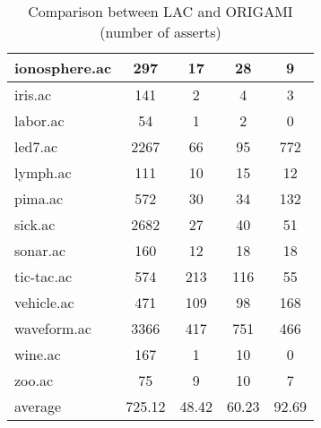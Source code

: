 \begin{table}[htbp]
\begin{tabular}{|l|c|c|c|c|}
		\hline
		ionosphere.ac   & 297           & 17                 & 28                       & 9                             \\
		\hline
		iris.ac         & 141           & 2                  & 4                        & 3                             \\
		\hline
		labor.ac        & 54            & 1                  & 2                        & 0                             \\
		\hline
		led7.ac         & 2267          & 66                 & 95                       & 772                           \\
		\hline
		lymph.ac        & 111           & 10                 & 15                       & 12                            \\
		\hline
		pima.ac         & 572           & 30                 & 34                       & 132                           \\
		\hline
		sick.ac         & 2682          & 27                 & 40                       & 51                            \\
		\hline
		sonar.ac        & 160           & 12                 & 18                       & 18                            \\
		\hline
		tic-tac.ac      & 574           & 213                & 116                      & 55                            \\
		\hline
		vehicle.ac      & 471           & 109                & 98                       & 168                           \\
		\hline
		waveform.ac     & 3366          & 417                & 751                      & 466                           \\
		\hline
		wine.ac         & 167           & 1                  & 10                       & 0                             \\
		\hline
		zoo.ac          & 75            & 9                  & 10                       & 7                             \\
		\hline
		average         & 725.12        & 48.42              & 60.23                    & 92.69                         \\
		\hline
		\end{tabular}
	\caption{Comparison between LAC and ORIGAMI (number of asserts)}
	\label{tab:comparison_lac_origami}
\end{table}
